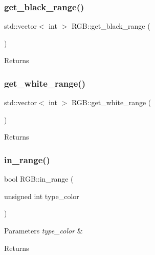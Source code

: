 \subsubsection{\texorpdfstring{get\+\_\+black\+\_\+range()}{get\_black\_range()}}
{\footnotesize\ttfamily std\+::vector$<$ int $>$ R\+G\+B\+::get\+\_\+black\+\_\+range (\begin{DoxyParamCaption}{ }\end{DoxyParamCaption})}

\begin{DoxyReturn}{Returns}

\end{DoxyReturn}
\mbox{\label{class_r_g_b_a96764f94cfd38f38b0e975c3c77ffaa5}} 
\subsubsection{\texorpdfstring{get\+\_\+white\+\_\+range()}{get\_white\_range()}}
{\footnotesize\ttfamily std\+::vector$<$ int $>$ R\+G\+B\+::get\+\_\+white\+\_\+range (\begin{DoxyParamCaption}{ }\end{DoxyParamCaption})}

\begin{DoxyReturn}{Returns}

\end{DoxyReturn}
\mbox{\label{class_r_g_b_a61239b0df41eba4c53a2a7c6feaff698}} 
\subsubsection{\texorpdfstring{in\+\_\+range()}{in\_range()}}
{\footnotesize\ttfamily bool R\+G\+B\+::in\+\_\+range (\begin{DoxyParamCaption}\item[{unsigned int}]{type\+\_\+color }\end{DoxyParamCaption})}


\begin{DoxyParams}{Parameters}
{\em type\+\_\+color} & \\
\hline
\end{DoxyParams}
\begin{DoxyReturn}{Returns}

\end{DoxyReturn}
\mbox{\label{class_r_g_b_a6d5013f3b077886a1a92fa2b16628d22}} 
